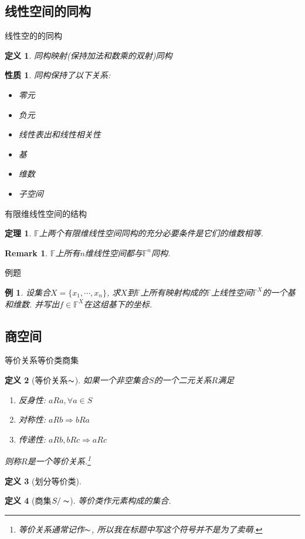 \documentclass[11pt]{beamer}
\newtheorem{defi}{定义}[section]
\newtheorem{prop}{性质}[section]
\newtheorem{thrm}{定理}[section]
\newtheorem{exmp}{例}[section]
\newtheorem{rmk}{Remark}[section]
\begin{document}
\subsection{线性空间的同构}
\frame{\subsectionpage}

\begin{frame}{线性空的的同构}
\begin{defi}
	同构映射(保持加法和数乘的双射)\quad 同构
\end{defi}
\begin{prop}
	同构保持了以下关系:
	\begin{itemize}
		\item 零元
		\item 负元
		\item 线性表出和线性相关性
		\item 基
		\item 维数
		\item 子空间
	\end{itemize}
\end{prop}
\end{frame}

\begin{frame}{有限维线性空间的结构}
\begin{thrm}
	$\mathbb{F}$上两个有限维线性空间同构的充分必要条件是它们的维数相等.
\end{thrm}
\begin{rmk}
	$\mathbb{F}$上所有$n$维线性空间都与$\mathbb{F}^n$同构.
\end{rmk}
\end{frame}

\begin{frame}{例题}
	\begin{exmp}
		设集合$X=\{x_1,\cdots, x_n\}$, 求$X$到$\mathbb{F}$上所有映射构成的$\mathbb{F}$上线性空间$\mathbb{F}^X$的一个基和维数. 并写出$f\in\mathbb{F}^X$在这组基下的坐标.
	\end{exmp}
\end{frame}

\subsection{商空间}
\frame{\subsectionpage}

\begin{frame}{等价关系\quad 等价类\quad 商集}
	\begin{defi}[等价关系$\thicksim$]
		如果一个非空集合$S$的一个二元关系$R$满足
		\begin{enumerate}
			\item 反身性: $aRa, \forall a\in S$
			\item 对称性: $aRb\Rightarrow bRa$
			\item 传递性: $aRb, bRc\Rightarrow aRc$
		\end{enumerate}
		则称$R$是一个等价关系.\footnote{等价关系通常记作$\thicksim$, 所以我在标题中写这个符号并不是为了卖萌.}
	\end{defi}
	\begin{defi}[划分\quad 等价类]
	\end{defi}
	\begin{defi}[商集$S/\thicksim$]
		等价类作元素构成的集合.
	\end{defi}
\end{frame}
\end{document}
